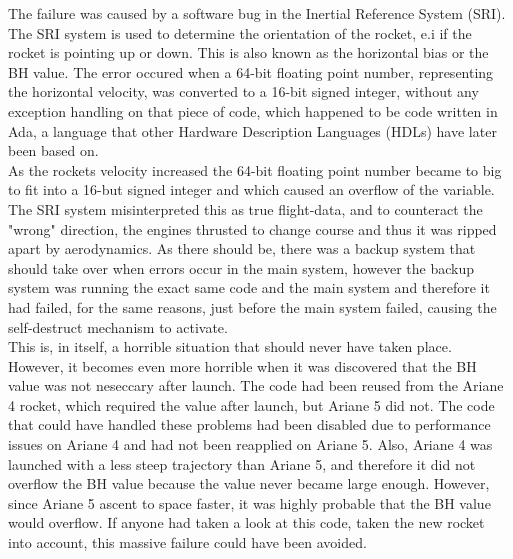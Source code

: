 \documentclass[a4paper]{report}
\begin{document}
The failure was caused by a software bug in the Inertial Reference System (SRI). The SRI system is used to determine the orientation of the rocket, e.i if the rocket is pointing up or down. This is also known as the horizontal bias or the BH value. The error occured when a 64-bit floating point number, representing the horizontal velocity, was converted to a 16-bit signed integer, without any exception handling on that piece of code, which happened to be code written in Ada, a language that other Hardware Description Languages (HDLs) have later been based on.\\ As the rockets velocity increased the 64-bit floating point number became to big to fit into a 16-but signed integer and which caused an overflow of the variable. The SRI system misinterpreted this as true flight-data, and to counteract the "wrong" direction, the engines thrusted to change course and thus it was ripped apart by aerodynamics. As there should be, there was a backup system that should take over when errors occur in the main system, however the backup system was running the exact same code and the main system and therefore it had failed, for the same reasons, just before the main system failed, causing the self-destruct mechanism to activate.\\ This is, in itself, a horrible situation that should never have taken place. However, it becomes even more horrible when it was discovered that the BH value was not neseccary after launch. The code had been reused from the Ariane 4 rocket, which required the value after launch, but Ariane 5 did not. The code that could have handled these problems had been disabled due to performance issues on Ariane 4 and had not been reapplied on Ariane 5. Also, Ariane 4 was launched with a less steep trajectory than Ariane 5, and therefore it did not overflow the BH value because the value never became large enough. However, since Ariane 5 ascent to space faster, it was highly probable that the BH value would overflow. If anyone had taken a look at this code, taken the new rocket into account, this massive failure could have been avoided. 
\end{document}
